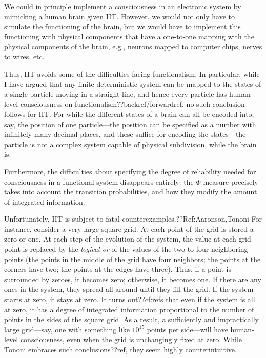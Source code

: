 We could in principle implement a consciousness in an electronic system by mimicking a human brain given IIT. However, we would 
not only have to simulate the functioning of the brain, but we would have to implement this functioning with  
physical components that have a one-to-one mapping with the physical components of the brain, e.g., neurons mapped to 
computer chips, nerves to wires, etc.

Thus, IIT avoids some of the difficulties facing functionalism. In particular, while I have argued that any 
finite deterministic system can be mapped to the states of a single particle moving in a straight line, and 
hence every particle has human-level consciousness on functionalism??backref/forwardref, no such conclusion 
follows for IIT. For while the different states of a brain can all be encoded into, say, the position of one
particle---the position can be specified as a number with infinitely many decimal places, and these suffice
for encoding the states---the particle is not a complex system capable of physical subdivision, while the brain is. 

Furthermore, the difficulties about specifying the degree of reliability needed for consciousness in a functional
system disappears entirely: the $\Phi$ measure precisely takes into account the transition probabilities, and how
they modify the amount of integrated information.

Unfortunately, IIT is subject to fatal counterexamples.??Ref:Aaronson,Tononi For instance, consider a very large square grid.
At each point of the grid is stored a zero or one. At each step of the evolution of the system, the value at 
each grid point is replaced by the \textit{logical or} of the values of the two to four neighboring points (the 
points in the middle of the grid have four neighbors; the points at the corners have two; the points at the 
edges have three). Thus, if a point is surrounded by zeroes, it becomes zero; otherwise, it becomes one. If 
there are any ones in the system, they spread all around until they fill the grid. If the system starts at zero, 
it stays at zero. It turns out??cf:refs that even if the system is all at zero, it has a 
degree of integrated information proportional to the number of points in the sides of the square grid. As a 
result, a sufficiently and impractically large grid---say, one with something like $10^{15}$ points per side---will 
have human-level consciousness, even when the grid is unchangingly fixed at zero. While Tononi embraces such 
conclusions??ref, they seem highly counterintuitive.

